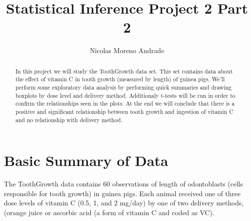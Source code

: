 \documentclass{article}\usepackage[]{graphicx}\usepackage[]{color}
\begin{document}







\title{Statistical Inference Project 2 Part 2}
\author{Nicolas Moreno Andrade}
\maketitle
\begin{abstract}
In this project we will study the ToothGrowth data set. This set contains data about the effect of vitamin C in tooth growth (measured by length) of guinea pigs. We'll perform some exploratory data analysis by performing quick summaries and drawing boxplots by dose level and delivery method. Additionaly t-tests will be run in order to confirm the relationships seen in the plots. At the end we will conclude that there is a positive and significant relationship between tooth growth and ingestion of vitamin C and no relationship with delivery method.   
\end{abstract}

\section{Basic Summary of Data}

The ToothGrowth data contains 60 observations of length of odontoblasts (cells responsible for tooth growth) in guinea pigs. Each animal received one of three dose levels of vitamin C (0.5, 1, and 2 mg/day) by one of two delivery methods, (orange juice or ascorbic acid (a form of vitamin C and coded as VC). 
\end{document}
